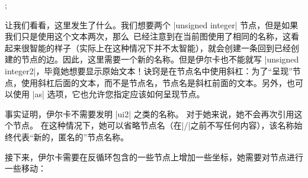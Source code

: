 %
\begin{codeexample}[preamble={\usetikzlibrary{graphs,shapes.misc}}]
\tikz {};
\end{codeexample}
%

让我们看看，这里发生了什么。我们想要两个 |unsigned integer| 节点，但是如果我们只是使用这个文本两次，那么\tikzname\ 已经注意到在当前图使用了相同的名称，这看起来很智能的样子（实际上在这种情况下并不太智能），就会创建一条回到已经创建的节点的边。因此，这里需要一个新的名称。但是伊尔卡也不能就写 |unsigned integer2|，毕竟她想要显示原始文本！诀窍是在节点名中使用斜杠：为了``呈现''节点，使用斜杠后面的文本，而不是节点名，节点名是斜杠前面的文本。另外，也可以使用 |as| 选项，它也允许您指定应该如何呈现节点。


事实证明，伊尔卡不需要发明 |ui2| 之类的名称。 对于她来说，她不会再次引用这个节点。 在这种情况下，她可以省略节点名（在|/|之前不写任何内容），该名称始终代表``新的，匿名的''节点名称。


接下来，伊尔卡需要在反循环包含的一些节点上增加一些坐标，她需要对节点进行一些移动：

